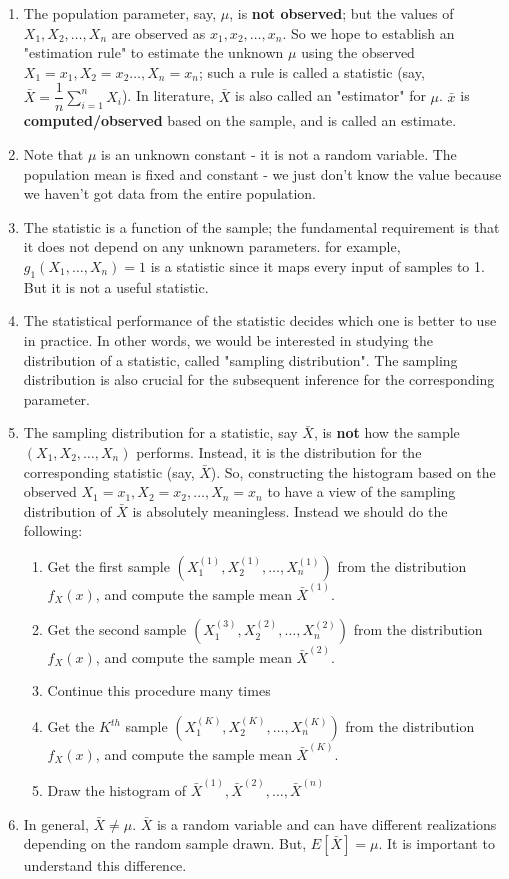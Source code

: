 \begin{enumerate}
    \item The population parameter, say, $\mu$,  is \textbf{not observed}; but the values of $X_1, X_2, \dots, X_n$ are observed as $x_1, x_2, \dots, x_n$. So we hope to establish an "estimation rule" to estimate the unknown $\mu$ using the observed $X_1 = x_1, X_2 = x_2 \dots, X_n = x_n$; such a rule is called a statistic (say, $\bar{X} = \dfrac{1}{n}\sum_{i = 1}^n X_i$). In literature, $\bar{X}$ is also called an "estimator" for $\mu$. $\bar{x}$ is \textbf{computed/observed} based on the sample, and is called an estimate.
    \item Note that $\mu$ is an unknown constant - it is not a random variable. The population mean is fixed and constant - we just don't know the value because we haven't got data from the entire population.
    \item The statistic is a function of the sample; the fundamental requirement is that it does not depend on any unknown parameters. for example, $g_1(X_1, \dots, X_n) = 1$ is a statistic since it maps every input of samples to 1. But it is not a useful statistic.
    \item The statistical performance of the statistic decides which one is better to use in practice. In other words, we would be interested in studying the distribution of a statistic, called "sampling distribution". The sampling distribution is also crucial for the subsequent inference for the corresponding parameter.
    \item The sampling distribution for a statistic, say $\bar{X}$, is \textbf{not} how the sample $(X_1, X_2, \dots, X_n)$ performs. Instead, it is the distribution for the corresponding statistic (say, $\bar{X}$). So, constructing the histogram based on the observed $X_1 = x_1, X_2 = x_2, \dots, X_n = x_n$ to have a view of the sampling distribution of $\bar{X}$ is absolutely meaningless. Instead we should do the following:
    \begin{enumerate}
        \item Get the first sample $(X_1^{(1)}, X_2^{(1)}, \dots, X_n^{(1)})$ from the distribution $f_X(x)$, and compute the sample mean $\bar{X}^{(1)}$.
        \item Get the second sample $(X_1^{(3)}, X_2^{(2)}, \dots, X_n^{(2)})$ from the distribution $f_X(x)$, and compute the sample mean $\bar{X}^{(2)}$.
        \item Continue this procedure many times
        \item Get the $K^{th}$ sample $(X_1^{(K)}, X_2^{(K)}, \dots, X_n^{(K)})$ from the distribution $f_X(x)$, and compute the sample mean $\bar{X}^{(K)}$.
        \item Draw the histogram of $\bar{X}^{(1)}, \bar{X}^{(2)}, \dots, \bar{X}^{(n)}$
    \end{enumerate}
    \item In general, $\bar{X} \neq \mu$. $\bar{X}$ is a random variable and can have different realizations depending on the random sample drawn. But, $E[\bar{X}] = \mu$. It is important to understand this difference.
\end{enumerate}

